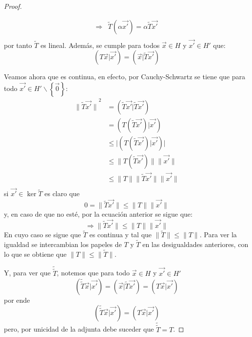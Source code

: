 \documentclass[12pt]{report}
\theoremstyle{largebreak}
\newcommand\abs[1]{\ensuremath{\big|#1\big|}}
\newcommand\adj[1]{\ensuremath{\widetilde{#1}}}
\newcommand\pint[2]{\ensuremath{\left(#1\big|#2\right)}}
\newcommand\norm[1]{\ensuremath{\|#1\|}}
\begin{document}
\begin{proof}
\begin{itemize}
\begin{equation*}
\begin{split}
                    \Rightarrow&\adj{T}(\alpha\vec{x'})=\alpha\adj{T}\vec{x'}\\
                \end{split}
            \end{equation*}
            por tanto $\adj{T}$ es lineal. Además, se cumple para todos $\vec{x}\in H$ y $\vec{x'}\in H'$ que:
            \begin{equation*}
                \pint{T\vec{x}}{\vec{x'}}=\pint{\vec{x}}{\adj{T} \vec{x'}}
            \end{equation*}
        \end{itemize}

        Veamos ahora que es continua, en efecto, por Cauchy-Schwartz se tiene que para todo $\vec{x'}\in H'\backslash\left\{\vec{0} \right\}$:
        \begin{equation*}
            \begin{split}
                \norm{\adj{T}\vec{x'}}^2&=\pint{\adj{T}\vec{x'}}{\adj{T}\vec{x'}}\\
                &=\pint{T(\adj{T}\vec{x'})}{\vec{x'}}\\
                &\leq\abs{\pint{T(\adj{T}\vec{x'})}{\vec{x'}}}\\
                &\leq\norm{T(\adj{T}\vec{x'})}\norm{\vec{x'}} \\
                &\leq\norm{T}\norm{\adj{T}\vec{x'}}\norm{\vec{x'}} \\
            \end{split}
        \end{equation*}
        si $\vec{x'}\in\ker \adj{T}$ es claro que
        \begin{equation*}
            0=\norm{\adj{T}\vec{x'}}\leq\norm{T}\norm{\vec{x'}}
        \end{equation*}
        y, en caso de que no esté, por la ecuación anterior se sigue que:
        \begin{equation*}
            \Rightarrow \norm{\adj{T} \vec{x'}}\leq\norm{T}\norm{\vec{x'}}
        \end{equation*}
        En cuyo caso se sigue que $\adj{T}$ es continua y tal que $\norm{\adj{T}}\leq\norm{T}$. Para ver la igualdad se intercambian los papeles de $T$ y $\adj{T}$ en las desigualdades anteriores, con lo que se obtiene que $\norm{T}\leq\norm{\adj{T}}$.

        Y, para ver que $\adj{\adj{T}}$, notemos que para todo $\vec{x}\in H$ y $\vec{x'}\in H'$
        \begin{equation*}
            \pint{\adj{\adj{T}}\vec{x}}{\vec{x'}}=\pint{\vec{x}}{\adj{T}\vec{x'}}=\pint{T\vec{x}}{\vec{x'}}
        \end{equation*}
        por ende
        \begin{equation*}
            \pint{\adj{\adj{T}}\vec{x}}{\vec{x'}}=\pint{T\vec{x}}{\vec{x'}}
        \end{equation*}
        pero, por unicidad de la adjunta debe suceder que $\adj{\adj{T}}=T$.


\end{proof}
\end{document}
